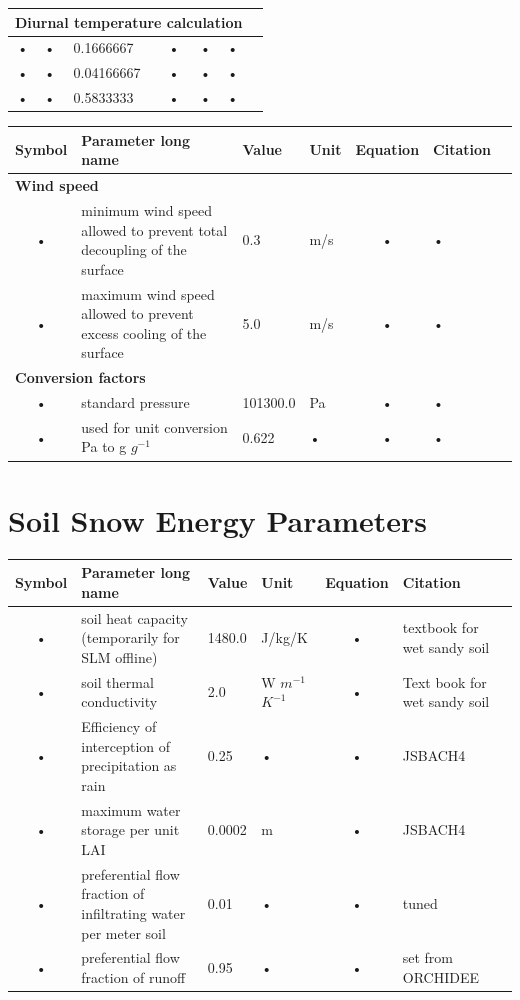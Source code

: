 \documentclass[11pt,oneside,openright,a4paper,fleqn]{book}  %
\begin{document}
\begin{table}
\begin{tabularx}{\linewidth}{|c|X|l|l|c|l|c|}
\multicolumn{6}{l}{\bf Diurnal temperature calculation}\\
\hline
• & • & 0.1666667 & • & • & • \\
• & • & 0.04166667 & • & • & • \\
• & • & 0.5833333 & • & • & • \\

\hline
\end{tabularx}
\end{table}


\begin{table}
\begin{tabularx}{\linewidth}{|c|X|l|l|c|l|c|} %
\hline 
Symbol & Parameter long name & Value & Unit & Equation & Citation \\
\hline 

\multicolumn{6}{l}{\bf Wind speed}\\
\hline
• & minimum wind speed allowed to prevent total decoupling of the surface & 0.3 & m/s & • & • \\
• & maximum wind speed allowed to prevent excess cooling of the surface & 5.0 & m/s & • & • \\
\hline 

\multicolumn{6}{l}{\bf Conversion factors}\\
\hline
• & standard pressure & 101300.0 & Pa & • & • \\
• & used for unit conversion Pa to g $g^{-1}$ & 0.622 & • & • & • \\
\hline 
\end{tabularx}
\end{table}


\begin{table}
\section{Soil Snow Energy Parameters}\label{tab:sse:param}

\begin{tabularx}{\linewidth}{|c|X|l|l|c|l|c|} %
\hline 
Symbol & Parameter long name & Value & Unit & Equation & Citation \\
\hline
• & soil heat capacity (temporarily for SLM offline) & 1480.0 & J/kg/K & • & textbook for wet sandy soil \\
• & soil thermal conductivity & 2.0 & W $m^{-1}$ $K^{-1}$ & • & Text book for wet sandy soil \\
• & Efficiency of interception of precipitation as rain & 0.25 & • & • & JSBACH4 \\
• & maximum water storage per unit LAI & 0.0002 & m & • & JSBACH4 \\
• & preferential flow fraction of infiltrating water per meter soil & 0.01 & • & • & tuned \\
• & preferential flow fraction of runoff & 0.95 & • & • & set from ORCHIDEE \\

\hline
\end{tabularx}
\end{table}
\end{document}
